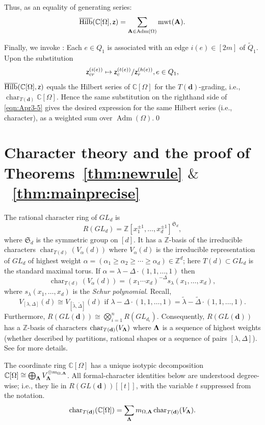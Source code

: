 \documentclass[12pt]{amsart}
\renewcommand{\d}{\mathbf{d}}
\DeclareMathOperator{\Std}{\operatorname{Adm}}
\theoremstyle{definition}
\theoremstyle{remark}
\begin{document}
Thus, as an equality of generating series:
\begin{equation}\label{eqn:Apr3-5}
\overline{\operatorname{Hilb}}({\mathbb C}[\Omega],{\sf z})=\sum_{{\bf A}\in \Std(\Omega)} \operatorname{mwt}({\bf A}).
\end{equation}

Finally, we invoke \cite{KKR}: Each $e\in Q_1$ is associated with an edge $i(e)\in [2m]$ of ${\widetilde Q}_1$.  
Upon the substitution 
\[{\sf z}_{cr}^{(i(e))}\mapsto {\sf z}_c^{(t(e))}/{\sf z}_r^{(h(e))}, e\in Q_1,\]
$\overline{\operatorname{Hilb}}({\mathbb C}[\Omega],{\sf z})$ equals the Hilbert series of ${\mathbb C}[\Omega]$
for the $T(\d)$-grading, i.e., $\operatorname{char}_{T(\d)}{\mathbb C}[\Omega]$.
 Hence the same substitution on the righthand side of \eqref{eqn:Apr3-5}
gives the desired expression for the same Hilbert series (i.e., character), as a weighted sum over $\operatorname{Adm}(\Omega)$.\qed


\section{Character theory and the proof of Theorems~\ref{thm:newrule} $\&$~\ref{thm:mainprecise}}\label{sec:proof-cont}
The rational character ring of $GL_d$ is 
\[R(GL_d)=\mathbb Z[x_1^{\pm1},\ldots,x_d^{\pm1}]^{{\mathfrak S}_d},\] 
where
${\mathfrak S}_d$ is the symmetric group on $[d]$. It has a ${\mathbb Z}$-basis of  the irreducible characters
$\operatorname{char}_{T(d)}(V_{\alpha}(d))$ where $V_{\alpha}(d)$ is the irreducible representation of $GL_d$ of highest
weight $\alpha=(\alpha_1\geq \alpha_2\geq\cdots\geq \alpha_{d})\in {\mathbb Z}^d$; here $T(d)\subset GL_d$ is the standard maximal torus. If $\alpha=\lambda-\Delta\cdot(1,1,\ldots,1)$ then 
\[\operatorname{char}_{T(d)}(V_{\alpha}(d))=(x_1\cdots x_d)^{-\Delta}s_{\lambda}(x_1,\ldots,x_d),\] 
where $s_{\lambda}(x_1,\ldots,x_d)$ is the \emph{Schur polynomial}. Recall, 
\[V_{[\lambda,\Delta]}(d)\cong V_{[\widetilde\lambda,\widetilde\Delta]}(d) \text{ if $\lambda-\Delta\cdot(1,1,\ldots,1)=\widetilde\lambda-\widetilde\Delta\cdot(1,1,\ldots,1)$.}\] 
Furthermore, 
$R(GL(\d)) \cong \bigotimes_{i=1}^n R(GL_{d_i})$.
Consequently, $R(GL(\d))$ has a ${\mathbb Z}$-basis of characters $\operatorname{char}_{T(\d)}(V_{{\bf \Lambda}})$ where ${\bf \Lambda}$ is a sequence of highest weights (whether described by partitions, rational shapes or a sequence of pairs $[\lambda,\Delta]$). See \cite{Stembridge} for more details.

The coordinate ring $\mathbb{C}[\Omega]$ has a unique isotypic decomposition 
$\mathbb{C}[\Omega] \cong \bigoplus_{{\bf \Lambda}}  V_{{\bf \Lambda}}^{\oplus m_{\Omega,{\bf \Lambda}}}$.
All formal-character identities below are understood degree-wise; i.e.,
they lie in $R(GL(\d))[[t]]$, with the variable $t$ suppressed from the notation.
\begin{equation}
\label{eqn:June24rrr}
\operatorname{char}_{T(\d)}({\mathbb C}[\Omega])=
\sum_{{\bf \Lambda}} m_{\Omega, {\bf \Lambda}}\, \text{char}_{T(\d)}(V_{{\bf \Lambda}}).
\end{equation}
\end{document}
